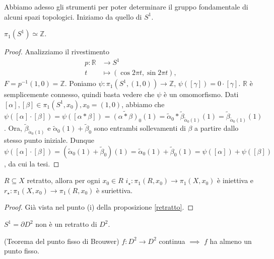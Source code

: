 Abbiamo adesso gli strumenti per poter determinare il gruppo fondamentale di alcuni spazi topologici. Iniziamo da quello di $S^1$.

\begin{thm}
  $\pi_1(S^1) \simeq \mathbb{Z}$.
\end{thm}

\begin{proof}
  Analizziamo il rivestimento
  \begin{align*}
    p: \mathbb{R} &\longrightarrow S^1 \\
    t &\longmapsto (\cos{2\pi t}, \sin{2\pi t}),
  \end{align*}
  $F=p^{-1}(1, 0)=\mathbb{Z}$. Poniamo $\psi:\pi_1(S^1, (1, 0)) \longrightarrow \mathbb{Z}$, $\psi([\gamma])=0 \cdot [\gamma]$. $\mathbb{R}$ è semplicemente connesso, quindi basta vedere che $\psi$ è un omomorfismo.
  Dati $[\alpha], [\beta] \in \pi_1(S^1, x_0), x_0=(1, 0)$,
  abbiamo che $\psi([\alpha] \cdot [\beta])=\psi([\alpha * \beta])=\widetilde{(\alpha * \beta)}_0(1)=\tilde{\alpha}_0*\tilde{\beta}_{\tilde{\alpha}_0(1)}(1)=\tilde{\beta}_{\tilde{\alpha}_0(1)}(1)$.
  Ora, $\tilde{\beta}_{\tilde{\alpha}_0(1)}$ e $\tilde{\alpha}_0(1)+\tilde{\beta}_0$ sono entrambi sollevamenti di $\beta$ a partire dallo stesso punto iniziale.
  Dunque $\psi([\alpha] \cdot [\beta])=(\tilde{\alpha}_0(1)+\tilde{\beta}_0)(1)=\tilde{\alpha}_0(1)+\tilde{\beta}_0(1)=\psi([\alpha])+\psi([\beta])$, da cui la tesi.
\end{proof}

\begin{prop}
  $R \subseteq X$ retratto, allora per ogni $x_0 \in R$ $i_{\star}: \pi_1(R, x_0) \longrightarrow \pi_1(X, x_0)$ è iniettiva e $r_{\star}: \pi_1(X, x_0) \longrightarrow \pi_1(R, x_0)$ è suriettiva.
\end{prop}

\begin{proof}
  Già vista nel punto (i) della proposizione \ref{retratto}.
\end{proof}

\begin{cor}
  $S^1=\partial D^2$ non è un retratto di $D^2$.
\end{cor}

\begin{thm}
  (Teorema del punto fisso di Brouwer) $f:D^2 \longrightarrow D^2$ continua $\implies$ $f$ ha almeno un punto fisso.
\end{thm}

